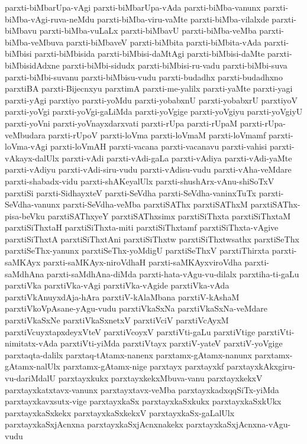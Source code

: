 {parxti-biMbarUpa-vAgi
parxti-biMbarUpa-vAda
parxti-biMba-vanunx
parxti-biMba-vAgi-ruva-neMdu
parxti-biMba-viru-vaMte
parxti-biMba-vilalxde
parxti-biMbavu
parxti-biMba-vuLaLx
parxti-biMbavU
parxti-biMba-veMba
parxti-biMba-veMbuva
parxti-biMbaveV
parxti-biMbita
parxti-biMbita-vAda
parxti-biMbisi
parxti-biMbisida
parxti-biMbisi-daMtAgi
parxti-biMbisi-daMte
parxti-biMbisidAdxne
parxti-biMbi-sidudx
parxti-biMbisi-ru-vadu
parxti-biMbi-suva
parxti-biMbi-suvanu
parxti-biMbisu-vudu
parxti-budadhx
parxti-budadhxno
parxtiBA
parxti-Bijecnxyu
parxtimA
parxti-me-yalilx
parxti-yaMte
parxti-yagi
parxti-yAgi
parxtiyo
parxti-yoMdu
parxti-yobabxnU
parxti-yobabxrU
parxtiyoV
parxti-yoVgi
parxti-yoVgi-gaLiMda
parxti-yoVgige
parxti-yoVgiyu
parxti-yoVgiyU
parxti-yoVni
parxti-yoVnayxdarxvati
parxti-rUpa
parxti-rUpaM
parxti-rUpa-veMbudara
parxti-rUpoV
parxti-loVma
parxti-loVmaM
parxti-loVmamf
parxti-loVma-vAgi
parxti-loVmAH
parxti-vacana
parxti-vacanavu
parxti-vahisi
parxti-vAkayx-dalUlx
parxti-vAdi
parxti-vAdi-gaLa
parxti-vAdiya
parxti-vAdi-yaMte
parxti-vAdiyu
parxti-vAdi-siru-vudu
parxti-vAdisu-vudu
parxti-vAha-veMdare
parxti-shabadx-vidu
parxti-shAKeyalUlx
parxti-shushArx-vAnu-shiSoTxV
parxtiSi
parxti-SidhayxteV
parxti-SeVdha
parxti-SeVdha-vaninxTuTx
parxti-SeVdha-vanunx
parxti-SeVdha-veMba
parxtiSAThx
parxtiSAThxM
parxtiSAThx-pisa-beVku
parxtiSAThxyeY
parxtiSAThxsimx
parxtiSiThxta
parxtiSiThxtaM
parxtiSiThxtaH
parxtiSiThxta-miti
parxtiSiThxtamf
parxtiSiThxta-vAgive
parxtiSiThxtA
parxtiSiThxtAni
parxtiSiThxtw
parxtiSiThxtwsathx
parxtiSeThx
parxtiSeThx-yanunx
parxtiSeThx-yoMdigU
parxtiSeThxV
parxtiThirxta
parxti-saMKAyx
parxti-saMKAyx-niroVdhaH
parxti-saMKAyxviroVdha
parxti-saMdhAna
parxti-saMdhAna-diMda
parxti-hata-vAgu-vu-dilalx
parxtiha-ti-gaLu
parxtiVka
parxtiVka-vAgi
parxtiVka-vAgide
parxtiVka-vAda
parxtiVkAnuyxdAja-hAra
parxtiV-kAlaMbana
parxtiV-kAshaM
parxtiVkoVpAsane-yAgu-vudu
parxtiVkaSxNa
parxtiVkaSxNa-veMdare
parxtiVkaSxNe
parxtiVkaSxnetxV
parxtiVciV
parxtiVcAyxM
parxtiVcuyxtapxdeyxVteV
parxtiVcoyxV
parxtiVti-gaLu
parxtiVtige
parxtiVti-nimitatx-vAda
parxtiVti-yiMda
parxtiVtayx
parxtiV-yateV
parxtiV-yoVgige
parxtaqta-dalilx
parxtaq-tAtamx-nanenx
parxtamx-gAtamx-nanunx
parxtamx-gAtamx-nalUlx
parxtamx-gAtamx-nige
parxtayx
parxtayxkf
parxtayxkAkxgiru-vu-dariMdalU
parxtayxkukx
parxtayxkekxMbuva-vanu
parxtayxkekxV
parxtayxkatxtavx-vanunx
parxtayxtavx-veMba
parxtayxkadxqqSiTx-yiMda
parxtayxkavxsutx-vige
parxtayxkaSx
parxtayxkaSxkukx
parxtayxkaSxkUkx
parxtayxkaSxkekx
parxtayxkaSxkekxV
parxtayxkaSx-gaLalUlx
parxtayxkaSxjAcnxna
parxtayxkaSxjAcnxnakekx
parxtayxkaSxjAcnxna-vAgu-vudu
}
